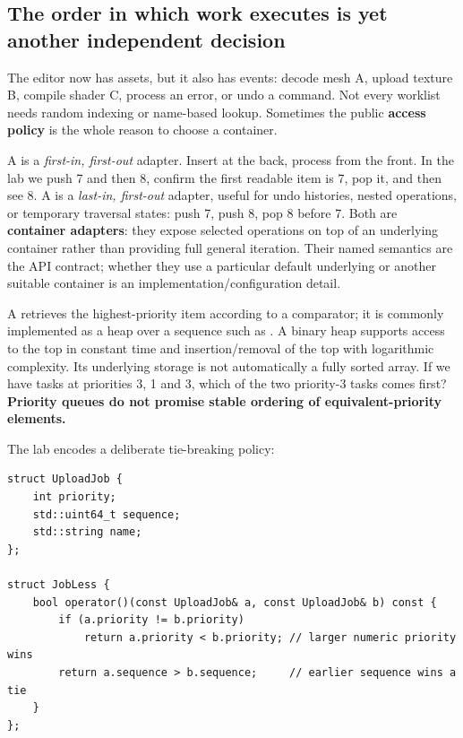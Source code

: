 \subsection{The order in which work executes is yet another independent decision}\label{05-engine-i-ch005-the-order-in-which-work-executes-is-yet-another-independent-decision}

\hypertarget{05-engine-i-ch005-the-order-in-which-work-executes-is-yet-another-independent-decision}{}

The editor now has assets, but it also has events: decode mesh A, upload texture B, compile shader C, process an error, or undo a command. Not every worklist needs random indexing or name-based lookup. Sometimes the public \textbf{access policy} is the whole reason to choose a container.

A  is a \emph{first-in, first-out} adapter. Insert at the back, process from the front. In the lab we push 7 and then 8, confirm the first readable item is 7, pop it, and then see 8. A  is a \emph{last-in, first-out} adapter, useful for undo histories, nested operations, or temporary traversal states: push 7, push 8, pop 8 before 7. Both are \textbf{container adapters}: they expose selected operations on top of an underlying container rather than providing full general iteration. Their named semantics are the API contract; whether they use a particular default underlying  or another suitable container is an implementation/configuration detail.

A  retrieves the highest-priority item according to a comparator; it is commonly implemented as a heap over a sequence such as . A binary heap supports access to the top in constant time and insertion/removal of the top with logarithmic complexity. Its underlying storage is not automatically a fully sorted array. If we have tasks at priorities 3, 1 and 3, which of the two priority-3 tasks comes first? \textbf{Priority queues do not promise stable ordering of equivalent-priority elements.}

The lab encodes a deliberate tie-breaking policy:

\begin{verbatim}
struct UploadJob {
    int priority;
    std::uint64_t sequence;
    std::string name;
};

struct JobLess {
    bool operator()(const UploadJob& a, const UploadJob& b) const {
        if (a.priority != b.priority)
            return a.priority < b.priority; // larger numeric priority wins
        return a.sequence > b.sequence;     // earlier sequence wins a tie
    }
};
\end{verbatim}

